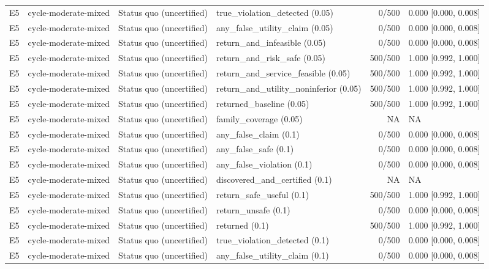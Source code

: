 \begin{longtable}{p{.04\linewidth}p{.18\linewidth}p{.19\linewidth}p{.16\linewidth}r p{.21\linewidth}}
E5 & cycle-moderate-mixed & Status quo (uncertified) & true\_violation\_detected (0.05) & 0/500 & 0.000 [0.000, 0.008]\\
E5 & cycle-moderate-mixed & Status quo (uncertified) & any\_false\_utility\_claim (0.05) & 0/500 & 0.000 [0.000, 0.008]\\
E5 & cycle-moderate-mixed & Status quo (uncertified) & return\_and\_infeasible (0.05) & 0/500 & 0.000 [0.000, 0.008]\\
E5 & cycle-moderate-mixed & Status quo (uncertified) & return\_and\_risk\_safe (0.05) & 500/500 & 1.000 [0.992, 1.000]\\
E5 & cycle-moderate-mixed & Status quo (uncertified) & return\_and\_service\_feasible (0.05) & 500/500 & 1.000 [0.992, 1.000]\\
E5 & cycle-moderate-mixed & Status quo (uncertified) & return\_and\_utility\_noninferior (0.05) & 500/500 & 1.000 [0.992, 1.000]\\
E5 & cycle-moderate-mixed & Status quo (uncertified) & returned\_baseline (0.05) & 500/500 & 1.000 [0.992, 1.000]\\
E5 & cycle-moderate-mixed & Status quo (uncertified) & family\_coverage (0.05) & NA & NA\\
E5 & cycle-moderate-mixed & Status quo (uncertified) & any\_false\_claim (0.1) & 0/500 & 0.000 [0.000, 0.008]\\
E5 & cycle-moderate-mixed & Status quo (uncertified) & any\_false\_safe (0.1) & 0/500 & 0.000 [0.000, 0.008]\\
E5 & cycle-moderate-mixed & Status quo (uncertified) & any\_false\_violation (0.1) & 0/500 & 0.000 [0.000, 0.008]\\
E5 & cycle-moderate-mixed & Status quo (uncertified) & discovered\_and\_certified (0.1) & NA & NA\\
E5 & cycle-moderate-mixed & Status quo (uncertified) & return\_safe\_useful (0.1) & 500/500 & 1.000 [0.992, 1.000]\\
E5 & cycle-moderate-mixed & Status quo (uncertified) & return\_unsafe (0.1) & 0/500 & 0.000 [0.000, 0.008]\\
E5 & cycle-moderate-mixed & Status quo (uncertified) & returned (0.1) & 500/500 & 1.000 [0.992, 1.000]\\
E5 & cycle-moderate-mixed & Status quo (uncertified) & true\_violation\_detected (0.1) & 0/500 & 0.000 [0.000, 0.008]\\
E5 & cycle-moderate-mixed & Status quo (uncertified) & any\_false\_utility\_claim (0.1) & 0/500 & 0.000 [0.000, 0.008]\\

\end{longtable}
